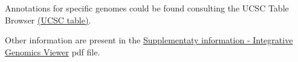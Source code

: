 Annotations for specific genomes could be found consulting the UCSC Table Browser \href{http://genome.ucsc.edu/cgi-bin/hgTables}{(UCSC table)}.

Other information are present in the
\href{https://authors.library.caltech.edu/72234/2/nbt.1754-S1.pdf}{Supplementaty
information - Integrative Genomics Viewer} pdf file.


